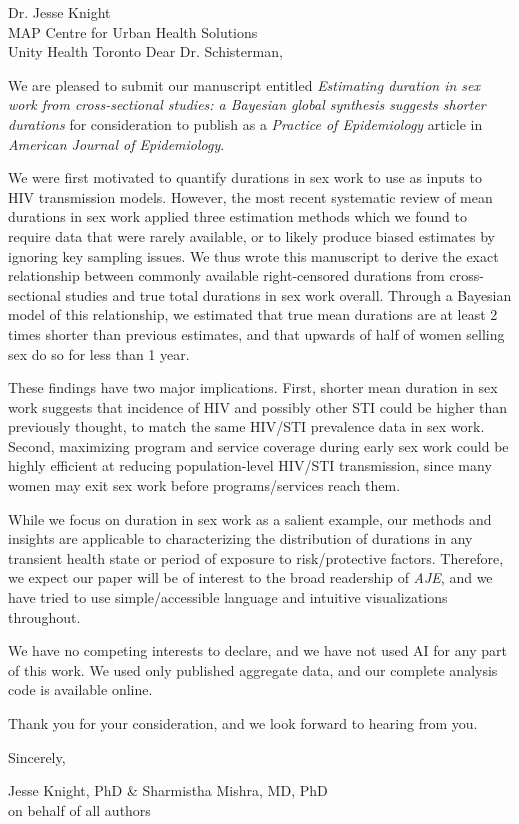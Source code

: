 \address{
  Dr. Enrique Schisterman\\
  Editor-in-Chief\\
  American Journal of Epidemiology
}{Dr. Jesse Knight\\
  MAP Centre for Urban Health Solutions\\
  Unity Health Toronto}
Dear Dr. Schisterman,
\par
We are pleased to submit our manuscript entitled
\emph{Estimating duration in sex work from cross-sectional studies:
      a Bayesian global synthesis suggests shorter durations}
for consideration to publish as a \emph{Practice of Epidemiology} article
in \emph{American Journal of Epidemiology}.
\par
We were first motivated to quantify durations in sex work
to use as inputs to HIV transmission models.
However, the most recent systematic review of mean durations in sex work
applied three estimation methods which we found
to require data that were rarely available, or
to likely produce biased estimates by ignoring key sampling issues.
We thus wrote this manuscript to derive the exact relationship between
commonly available right-censored durations from cross-sectional studies and
true total durations in sex work overall.
Through a Bayesian model of this relationship, we estimated that
true mean durations are at least 2 times shorter than previous estimates, and that
upwards of half of women selling sex do so for less than 1 year.
\par
These findings have two major implications.
First, shorter mean duration in sex work suggests that incidence of HIV and possibly other STI
could be higher than previously thought, to match the same HIV/STI prevalence data in sex work.
Second, maximizing program and service coverage during early sex work
could be highly efficient at reducing population-level HIV/STI transmission,
since many women may exit sex work before programs/services reach them.
\par
While we focus on duration in sex work as a salient example,
our methods and insights are applicable to characterizing the distribution of durations in
any transient health state or period of exposure to risk/protective factors.
Therefore, we expect our paper will be of interest to the broad readership of \emph{AJE},
and we have tried to use simple/accessible language and intuitive visualizations throughout.
\par
We have no competing interests to declare, and
we have not used AI for any part of this work.
We used only published aggregate data, and
our complete analysis code is available online.
\par
Thank you for your consideration, and we look forward to hearing from you.
\medskip\par
Sincerely,
\par
Jesse Knight, PhD \& Sharmistha Mishra, MD, PhD\\
on behalf of all authors
